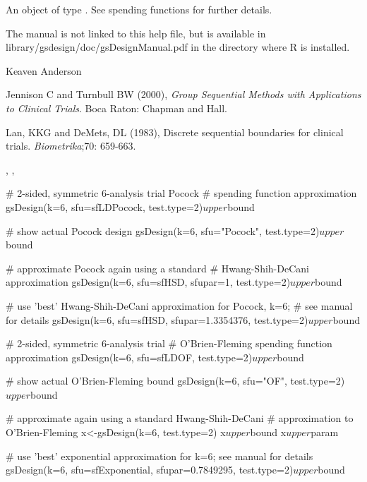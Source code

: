 \begin{Value}
An object of type . See spending functions for further details.
\end{Value}
\begin{Note}\relax
The manual is not linked to this help file, but is available in library/gsdesign/doc/gsDesignManual.pdf
in the directory where R is installed.
\end{Note}
\begin{Author}\relax
Keaven Anderson 
\end{Author}
\begin{References}\relax
Jennison C and Turnbull BW (2000), \emph{Group Sequential Methods with Applications to Clinical Trials}.
Boca Raton: Chapman and Hall.

Lan, KKG and DeMets, DL (1983), Discrete sequential boundaries for clinical trials. \emph{Biometrika};70: 659-663.
\end{References}
\begin{SeeAlso}\relax
{}, , 
\end{SeeAlso}
\begin{Examples}
\begin{ExampleCode}
# 2-sided,  symmetric 6-analysis trial Pocock
# spending function approximation 
gsDesign(k=6, sfu=sfLDPocock, test.type=2)$upper$bound

# show actual Pocock design
gsDesign(k=6, sfu="Pocock", test.type=2)$upper$bound

# approximate Pocock again using a standard
# Hwang-Shih-DeCani approximation
gsDesign(k=6, sfu=sfHSD, sfupar=1, test.type=2)$upper$bound

# use 'best' Hwang-Shih-DeCani approximation for Pocock,  k=6;
# see manual for details
gsDesign(k=6, sfu=sfHSD, sfupar=1.3354376, test.type=2)$upper$bound

# 2-sided, symmetric 6-analysis trial
# O'Brien-Fleming spending function approximation 
gsDesign(k=6, sfu=sfLDOF, test.type=2)$upper$bound

# show actual O'Brien-Fleming bound
gsDesign(k=6, sfu="OF", test.type=2)$upper$bound

# approximate again using a standard Hwang-Shih-DeCani 
# approximation to O'Brien-Fleming
x<-gsDesign(k=6, test.type=2)
x$upper$bound
x$upper$param

# use 'best' exponential approximation for k=6; see manual for details
gsDesign(k=6, sfu=sfExponential, sfupar=0.7849295,
         test.type=2)$upper$bound
\end{ExampleCode}
\end{Examples}

